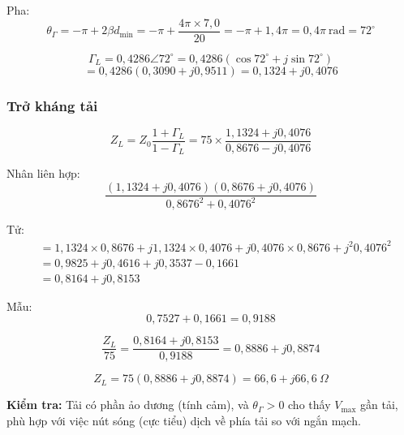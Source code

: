 \documentclass[12pt,a4paper]{article}
\begin{document}
Pha:
\[
\theta_\Gamma = -\pi + 2\beta d_{\min} = -\pi + \frac{4\pi \times 7{,}0}{20} = -\pi + 1{,}4\pi = 0{,}4\pi~\text{rad} = 72^\circ
\]

\[
\Gamma_L = 0{,}4286\angle 72^\circ = 0{,}4286(\cos 72^\circ + j\sin 72^\circ)
\]
\[
= 0{,}4286(0{,}3090 + j0{,}9511) = 0{,}1324 + j0{,}4076
\]

\subsubsection{Trở kháng tải}

\[
Z_L = Z_0 \frac{1 + \Gamma_L}{1 - \Gamma_L} = 75 \times \frac{1{,}1324 + j0{,}4076}{0{,}8676 - j0{,}4076}
\]

Nhân liên hợp:
\[
\frac{(1{,}1324 + j0{,}4076)(0{,}8676 + j0{,}4076)}{0{,}8676^2 + 0{,}4076^2}
\]

Tử:
\begin{align*}
&= 1{,}1324 \times 0{,}8676 + j1{,}1324 \times 0{,}4076 + j0{,}4076 \times 0{,}8676 + j^2 0{,}4076^2 \\
&= 0{,}9825 + j0{,}4616 + j0{,}3537 - 0{,}1661 \\
&= 0{,}8164 + j0{,}8153
\end{align*}

Mẫu:
\[
0{,}7527 + 0{,}1661 = 0{,}9188
\]

\[
\frac{Z_L}{75} = \frac{0{,}8164 + j0{,}8153}{0{,}9188} = 0{,}8886 + j0{,}8874
\]

\[
\boxed{Z_L = 75(0{,}8886 + j0{,}8874) = 66{,}6 + j66{,}6~\Omega}
\]

\textbf{Kiểm tra:} Tải có phần ảo dương (tính cảm), và $\theta_\Gamma > 0$ cho thấy $V_{\max}$ gần tải, phù hợp với việc nút sóng (cực tiểu) dịch về phía tải so với ngắn mạch.
\end{document}

